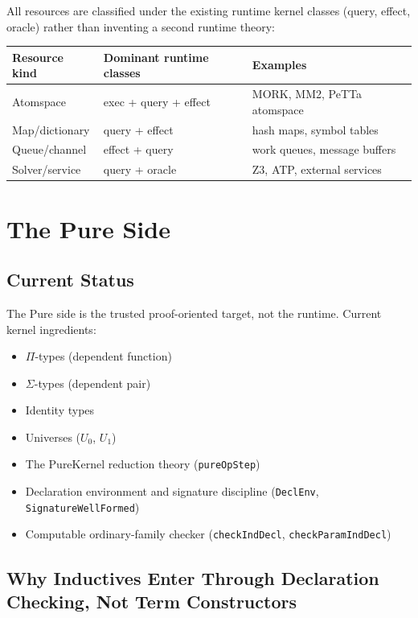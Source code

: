 \documentclass[11pt]{article}
\theoremstyle{remark}
\newcommand{\MORK}{\textup{MORK}}
\newcommand{\PeTTa}{\textup{PeTTa}}
\newcommand{\leanref}[1]{\texttt{#1}}
\begin{document}
\noindent
All resources are classified under the existing runtime kernel classes
(query, effect, oracle) rather than inventing a second runtime theory:

\begin{center}
\begin{tabular}{@{}lll@{}}
\toprule
Resource kind & Dominant runtime classes & Examples \\
\midrule
Atomspace & exec + query + effect & \MORK{}, MM2, \PeTTa{} atomspace \\
Map/dictionary & query + effect & hash maps, symbol tables \\
Queue/channel & effect + query & work queues, message buffers \\
Solver/service & query + oracle & Z3, ATP, external services \\
\bottomrule
\end{tabular}
\end{center}

\section{The Pure Side}
\label{sec:pure}

\subsection{Current Status}

The Pure side is the trusted proof-oriented target, not the runtime.
Current kernel ingredients:

\begin{itemize}[nosep]
  \item $\Pi$-types (dependent function)
  \item $\Sigma$-types (dependent pair)
  \item Identity types
  \item Universes ($U_0$, $U_1$)
  \item The PureKernel reduction theory (\leanref{pureOpStep})
  \item Declaration environment and signature discipline
  (\leanref{DeclEnv}, \leanref{SignatureWellFormed})
  \item Computable ordinary-family checker
  (\leanref{checkIndDecl}, \leanref{checkParamIndDecl})
\end{itemize}

\subsection{Why Inductives Enter Through Declaration Checking, Not Term Constructors}
\end{document}

